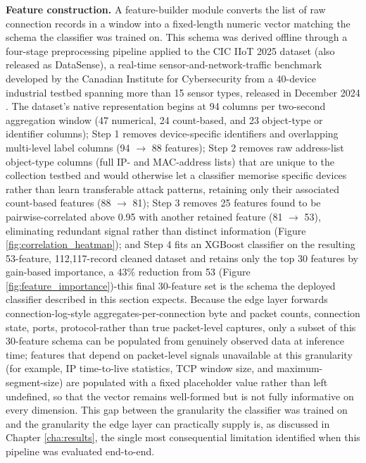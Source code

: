 \textbf{Feature construction.} A feature-builder module converts the list of raw connection records in a window into a fixed-length numeric vector matching the schema the classifier was trained on. This schema was derived offline through a four-stage preprocessing pipeline applied to the CIC IIoT 2025 dataset (also released as DataSense), a real-time sensor-and-network-traffic benchmark developed by the Canadian Institute for Cybersecurity from a 40-device industrial testbed spanning more than 15 sensor types, released in December 2024 \cite{Firouzi2025}. The dataset's native representation begins at 94 columns per two-second aggregation window (47 numerical, 24 count-based, and 23 object-type or identifier columns); Step 1 removes device-specific identifiers and overlapping multi-level label columns (94 $\to$ 88 features); Step 2 removes raw address-list object-type columns (full IP- and MAC-address lists) that are unique to the collection testbed and would otherwise let a classifier memorise specific devices rather than learn transferable attack patterns, retaining only their associated count-based features (88 $\to$ 81); Step 3 removes 25 features found to be pairwise-correlated above 0.95 with another retained feature (81 $\to$ 53), eliminating redundant signal rather than distinct information (Figure \ref{fig:correlation_heatmap}); and Step 4 fits an XGBoost classifier on the resulting 53-feature, 112{,}117-record cleaned dataset and retains only the top 30 features by gain-based importance, a 43\% reduction from 53 (Figure \ref{fig:feature_importance})-this final 30-feature set is the schema the deployed classifier described in this section expects. Because the edge layer forwards connection-log-style aggregates-per-connection byte and packet counts, connection state, ports, protocol-rather than true packet-level captures, only a subset of this 30-feature schema can be populated from genuinely observed data at inference time; features that depend on packet-level signals unavailable at this granularity (for example, IP time-to-live statistics, TCP window size, and maximum-segment-size) are populated with a fixed placeholder value rather than left undefined, so that the vector remains well-formed but is not fully informative on every dimension. This gap between the granularity the classifier was trained on and the granularity the edge layer can practically supply is, as discussed in Chapter \ref{cha:results}, the single most consequential limitation identified when this pipeline was evaluated end-to-end.

